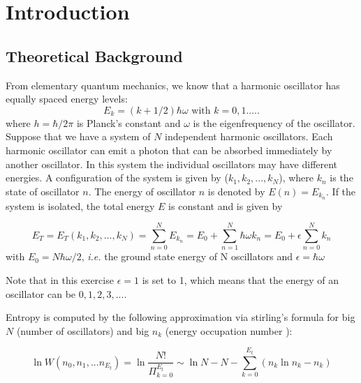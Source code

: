 \documentclass[10pt]{article}
\begin{document}
\maketitle
\pagebreak
\section{Introduction}
\subsection{Theoretical Background \cite{IMSSS}}
From elementary quantum mechanics, we know that a harmonic oscillator has equally spaced
energy levels:
\begin{equation} %
   E_k =(k+1/2)\hbar\omega \text{       with } k=0,1..... 
   \label{equation:1.1} 
\end{equation}
%
where $h = \hbar/2\pi$ is Planck’s constant and $\omega$ is the eigenfrequency of the oscillator. Suppose that we have a system of $N$ independent harmonic oscillators. Each harmonic oscillator can emit a photon that can be absorbed immediately by another oscillator. In this system the individual oscillators may have different energies. A configuration of the system is given by ($k_1, k_2, ..., k_N$), where $k_n$ is the state of oscillator $n$. The energy of oscillator $n$ is denoted by $E(n) = E_{k_n}$. If the system is isolated, the total energy $E$ is constant and is given by

\begin{equation} %
   E_T =E_T(k_1,k_2,...,k_N)=\sum_{n=0}^N E_{k_n}=E_0+\sum_{n=1}^N \hbar\omega k_n=E_0 +\epsilon\sum_{n=0}^N k_n 
   \label{equation:1.1} 
\end{equation}
%
with $E_0 = N\hbar\omega /2$, \emph{i.e.} the ground state energy of N oscillators and $\epsilon = \hbar \omega$


Note that in this exercise $\epsilon = 1$ is set to 1, which means that the energy of an oscillator can be $0, 1, 2, 3,...$. 

Entropy is computed by the following approximation via stirling's formula for big $N$ (number of oscillators) and big $n_k$ (energy occupation number ):


\begin{equation} %
\ln W (n_0,n_1,...n_{E_t})=\ln\frac{N!}{\Pi_{k=0}^{E_t}}\sim\ln N-N - \sum_{k=0}^{E_t}(n_k\ln n_k -n_k)
   \label{equation:1.1} 
\end{equation}
\end{document}
